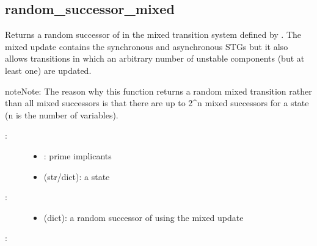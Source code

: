 \documentclass[letterpaper,10pt,english]{sphinxmanual}
\begin{document}
\subsection{random\_successor\_mixed}
\label{\detokenize{StateTransitionGraphs:random-successor-mixed}}\label{\detokenize{StateTransitionGraphs:successor-random-mixed}}

\begin{fulllineitems}
\label{\detokenize{StateTransitionGraphs:PyBoolNet.StateTransitionGraphs.random_successor_mixed}}
Returns a random successor of  in the mixed transition system defined by .
The mixed update contains the synchronous and asynchronous STGs
but it also allows transitions in which an arbitrary number of unstable components (but at least one) are updated.

\begin{sphinxadmonition}{note}{Note:}
The reason why this function returns a random mixed transition rather than all mixed successors is that there are up to
2\textasciicircum{}n mixed successors for a state (n is the number of variables).
\end{sphinxadmonition}
\begin{description}
\item[{:}] \leavevmode\begin{itemize}
\item {} 
: prime implicants

\item {} 
 (str/dict): a state

\end{itemize}

\item[{:}] \leavevmode\begin{itemize}
\item {} 
 (dict): a random successor of  using the mixed update

\end{itemize}

\end{description}

:

\begin{sphinxVerbatim}[commandchars=\\\{\}]
  
 
\end{sphinxVerbatim}

\end{fulllineitems}
\end{document}
